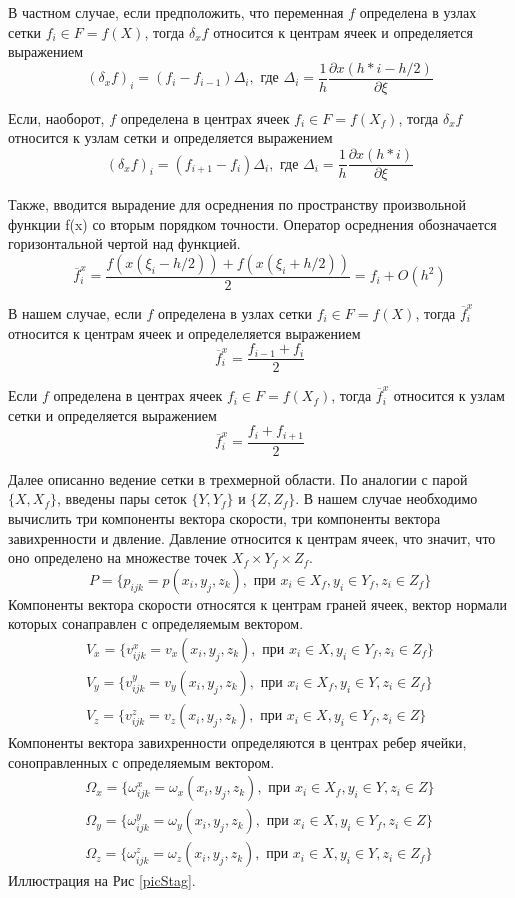 В частном случае, если предположить, что переменная $f$ определена в узлах сетки $ f_i \in F = f(X)$, тогда $\delta_x f$ относится к центрам ячеек и определяется выражением
$$
  (\delta_x f)_i = (f_i - f_{i-1}) \Delta_i, \text{ где } \Delta_i =  \frac{1}{h}\frac{\partial x(h*i - h/2)}{\partial \xi}
$$

Если, наоборот, $f$ определена в центрах ячеек $ f_i \in F = f(X_f)$, тогда $\delta_x f$
относится к узлам сетки и определяется выражением
$$
  (\delta_x f)_i = (f_{i+1} - f_i) \Delta_i, \text{ где } \Delta_i  = \frac{1}{h}\frac{\partial x(h*i)}{\partial \xi}
$$

Также, вводится вырадение для осреднения по пространству произвольной функции f(x) со вторым порядком точности. Оператор осреднения обозначается горизонтальной чертой над функцией. 
$$
  \overline{f}^x_i = \frac{f(x(\xi_i - h/2)) + f(x(\xi_i + h/2))}{2} = f_i + O(h^2)
$$

В нашем случае, если $f$ определена в узлах сетки $f_i \in F = f(X)$, тогда $\overline{f}^x_i$ относится к центрам ячеек и определеляется выражением
$$
  \overline{f}^x_i = \frac{f_{i-1} + f_{i}}{2}
$$

Если $f$ определена в центрах ячеек $f_i \in F = f(X_f)$, тогда $\overline{f}^x_i$ относится к узлам сетки и определяется выражением
$$
  \overline{f}^x_i = \frac{f_i + f_{i+1}}{2}
$$


Далее описанно ведение сетки в трехмерной области. 
По аналогии с парой $\{X,X_f\}$, введены пары сеток $\{Y,Y_f\}$ и $\{Z,Z_f\}$. В нашем случае необходимо вычислить три компоненты вектора скорости, три компоненты вектора завихренности и двление. Давление относится к центрам ячеек, что значит, что оно определено на множестве точек $X_f \times Y_f \times Z_f$.
$$
  P = \{p_{ijk} = p(x_i,y_j,z_k), \text{ при } x_i \in X_f, y_i \in Y_f, z_i \in Z_f\}
$$
Компоненты вектора скорости относятся к центрам граней ячеек, вектор нормали которых сонаправлен с определяемым вектором.
\begin{gather*}
  V_x = \{ v^x_{ijk} = v_x(x_i,y_j,z_k), \text{ при } x_i \in X, y_i \in Y_f, z_i \in Z_f \} \\
  V_y = \{ v^y_{ijk} = v_y(x_i,y_j,z_k), \text{ при } x_i \in X_f, y_i \in Y, z_i \in Z_f \} \\
  V_z = \{ v^z_{ijk} = v_z(x_i,y_j,z_k), \text{ при } x_i \in X, y_i \in Y_f, z_i \in Z \}
\end{gather*}
Компоненты вектора завихренности определяются в центрах ребер ячейки, соноправленных с определяемым вектором. 
\begin{gather*}
  \Omega_x = \{ \omega^x_{ijk} = \omega_x(x_i,y_j,z_k), \text{ при } x_i \in X_f, y_i \in Y, z_i \in Z \} \\
  \Omega_y = \{ \omega^y_{ijk} = \omega_y(x_i,y_j,z_k), \text{ при } x_i \in X, y_i \in Y_f, z_i \in Z \} \\
  \Omega_z = \{ \omega^z_{ijk} = \omega_z(x_i,y_j,z_k), \text{ при } x_i \in X, y_i \in Y, z_i \in Z_f \}
\end{gather*}
Иллюстрация на Рис \ref{picStag}.

